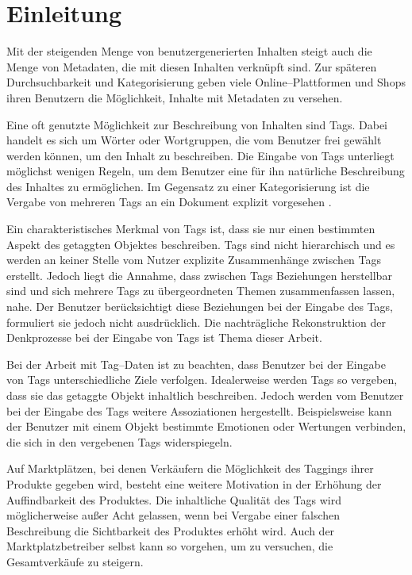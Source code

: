 \chapter{Einleitung}

Mit der steigenden Menge von benutzergenerierten Inhalten steigt auch die Menge von Metadaten, die mit diesen Inhalten verknüpft sind. Zur späteren Durchsuchbarkeit und Kategorisierung geben viele Online--Plattformen und Shops ihren Benutzern die Möglichkeit, Inhalte mit Metadaten zu versehen.

Eine oft genutzte Möglichkeit zur Beschreibung von Inhalten sind Tags. Dabei handelt es sich um Wörter oder Wortgruppen, die vom Benutzer frei gewählt werden können, um den Inhalt zu beschreiben. Die Eingabe von Tags unterliegt möglichst wenigen Regeln, um dem Benutzer eine für ihn natürliche Beschreibung des Inhaltes zu ermöglichen. Im Gegensatz zu einer Kategorisierung ist die Vergabe von mehreren Tags an ein Dokument explizit vorgesehen \cite{sc2005}.

Ein charakteristisches Merkmal von Tags ist, dass sie nur einen bestimmten Aspekt des getaggten Objektes beschreiben. Tags sind nicht hierarchisch und es werden an keiner Stelle vom Nutzer explizite Zusammenhänge zwischen Tags erstellt. Jedoch liegt die Annahme, dass zwischen Tags Beziehungen herstellbar sind und sich mehrere Tags zu übergeordneten Themen zusammenfassen lassen, nahe. Der Benutzer berücksichtigt diese Beziehungen bei der Eingabe des Tags, formuliert sie jedoch nicht ausdrücklich. Die nachträgliche Rekonstruktion der Denkprozesse bei der Eingabe von Tags ist Thema dieser Arbeit.

Bei der Arbeit mit Tag--Daten ist zu beachten, dass Benutzer bei der Eingabe von Tags unterschiedliche Ziele verfolgen. Idealerweise werden Tags so vergeben, dass sie das getaggte Objekt inhaltlich beschreiben. Jedoch werden vom Benutzer bei der Eingabe des Tags weitere Assoziationen hergestellt. Beispielsweise kann der Benutzer mit einem Objekt bestimmte Emotionen oder Wertungen verbinden, die sich in den vergebenen Tags widerspiegeln.

Auf Marktplätzen, bei denen Verkäufern die Möglichkeit des Taggings ihrer Produkte gegeben wird, besteht eine weitere Motivation in der Erhöhung der Auffindbarkeit des Produktes. Die inhaltliche Qualität des Tags wird möglicherweise außer Acht gelassen, wenn bei Vergabe einer falschen Beschreibung die Sichtbarkeit des Produktes erhöht wird. Auch der Marktplatzbetreiber selbst kann so vorgehen, um zu versuchen, die Gesamtverkäufe zu steigern.

